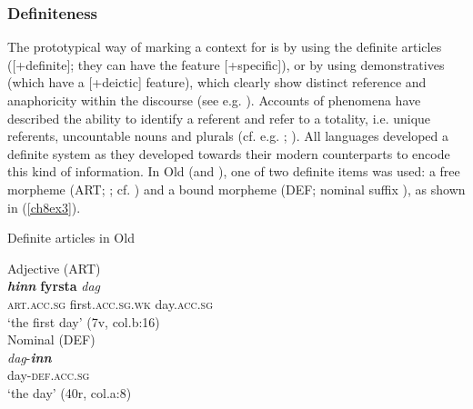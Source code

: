 \documentclass[output=paper,colorlinks,citecolor=brown]{langscibook}
\begin{document}
\subsubsection{Definiteness}\label{ch8s3.1.1}
\begin{sloppypar}
The prototypical way of marking a context for  is by using
the definite articles ({[}+definite{]}; they can have the feature
{[}+specific{]}), or by using demonstratives (which have a
{[}+deictic{]} feature), which clearly show distinct reference and
anaphoricity within the discourse (see e.g. \citealp{Schwarz2009}). Accounts of  phenomena have described the ability to identify a referent and refer to a totality, i.e. unique
referents, uncountable nouns and plurals (cf. e.g. \citealp{Lyons1999}; \citealp{Rampazzo2012}). All  languages developed a definite
 system as they developed towards their modern counterparts to encode this kind of
information. In Old  (and ), one of two definite
 items was used: a free morpheme (ART; ; cf.
\citealp[e15]{Borjarsetal16}) and a bound morpheme (DEF; nominal suffix
), as shown in (\ref{ch8ex3}).
\end{sloppypar}

\begin{exe}
\ex\label{ch8ex3}Definite articles in Old \begin{xlist}
\ex\label{ch8ex3a} Adjective  (ART)\\
\gll \textbf{\textit{hinn}} \textbf{fyrsta} \textit{dag} \\
\textsc{art.acc.sg} first.\textsc{acc.sg.wk} day.\textsc{acc.sg} \\
\glt `the first day' (7v, col.b:16) \\
 
\ex\label{ch8ex3b} Nominal  (DEF)\\
\gll \emph{dag}-\textbf{\textit{inn}} \\
day-\textsc{def.acc.sg} \\
\glt `the day' (40r, col.a:8)
\end{xlist}
\end{exe}
\end{document}
